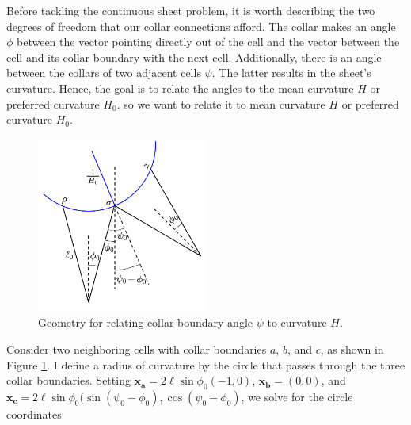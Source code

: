 
Before tackling the continuous sheet problem, it is worth describing the two degrees of freedom that our collar connections afford. 
The collar makes an angle $\phi$ between the vector pointing directly out of the cell and the vector between the cell and its collar boundary with the next cell. 
Additionally, there is an angle between the collars of two adjacent cells $\psi$. 
The latter results in the sheet's curvature. 
Hence, the goal is to relate the angles to the mean curvature $H$ or preferred curvature $H_0$.
so we want to relate it to mean curvature $H$ or preferred curvature $H_0$. 


\begin{figure}[htbp]
    \centering
    \includegraphics[width=0.5\textwidth]{hpsi.png}
    \caption[Geometry of sheet curvature]{Geometry for relating collar boundary angle $\psi$ to curvature $H$. }
    \label{fig:hpsi}
\end{figure}

Consider two neighboring cells with collar boundaries $a$, $b$, and $c$, as shown in Figure \ref{fig:hpsi}. 
I define a radius of curvature by the circle that passes through the three collar boundaries. 
Setting $\bm{x_a} = 2\ell\sin\phi_0(-1, 0)$, $\bm{x_b} = (0,0)$, and $\bm{x_c} = 2\ell\sin\phi_0 (\sin(\psi_0 - \phi_0), \cos(\psi_0-\phi_0)$, we solve for the circle coordinates 

